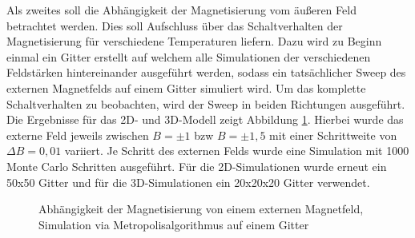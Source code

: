 Als zweites soll die Abhängigkeit der Magnetisierung vom äußeren Feld betrachtet werden. Dies soll Aufschluss über das Schaltverhalten der Magnetisierung für verschiedene Temperaturen liefern. Dazu wird zu Beginn einmal ein Gitter erstellt auf welchem alle Simulationen der verschiedenen Feldstärken hintereinander ausgeführt werden, sodass ein tatsächlicher Sweep des externen Magnetfelds auf einem Gitter simuliert wird. Um das komplette Schaltverhalten zu beobachten, wird der Sweep in beiden Richtungen ausgeführt. Die Ergebnisse für das 2D- und 3D-Modell zeigt Abbildung \ref{mpbsweep}. Hierbei wurde das externe Feld jeweils zwischen $B=\pm1$ bzw $B=\pm1,5$ mit einer Schrittweite von $\Delta B=0,01$ variiert. Je Schritt des externen Felds wurde eine Simulation mit 1000 Monte Carlo Schritten ausgeführt. Für die 2D-Simulationen wurde erneut ein 50x50 Gitter und für die 3D-Simulationen ein 20x20x20 Gitter verwendet.
\begin{figure}[H]
	\centering
	\caption{Abhängigkeit der Magnetisierung von einem externen Magnetfeld, Simulation via Metropolisalgorithmus auf einem Gitter}
	\label{mpbsweep}
\end{figure}
